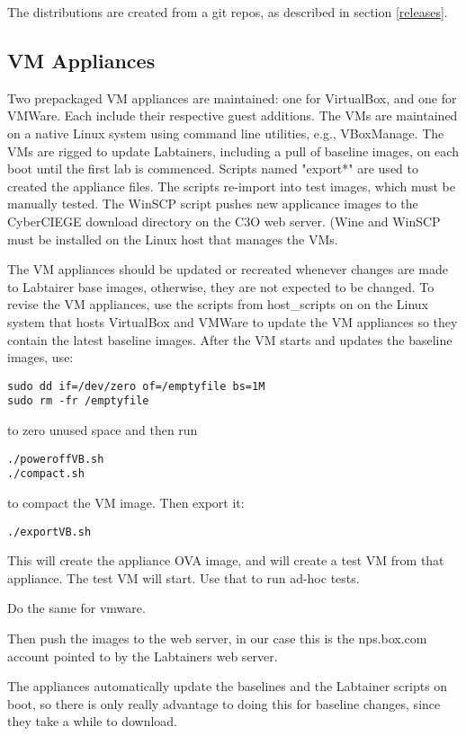 \documentclass[12pt]{article}
\begin{document}
The distributions are created from a git repos, as described in section \ref{releases}.

\subsection{VM Appliances}
Two prepackaged VM appliances are maintained: one for VirtualBox, and one for VMWare.  Each include
their respective guest additions.  The VMs are maintained on a native Linux system using command line
utilities, e.g., VBoxManage.  The VMs are rigged to update Labtainers, including a pull of
baseline images, on each boot until the first lab is commenced.  Scripts named "export*" are
used to created the appliance files.  The scripts re-import into test images, which must be
manually tested.  The WinSCP script pushes new applicance images to the CyberCIEGE download
directory on the C3O web server.  (Wine and WinSCP must be installed on the Linux host that
manages the VMs.

The VM appliances should be updated or recreated whenever changes are made to Labtairer base
images, otherwise, they are not expected to be changed.  To revise the VM appliances, use the scripts
from host\_scripts on 
on the Linux system that hosts VirtualBox and VMWare to update the VM appliances so they contain the latest baseline images.
After the VM starts and updates the baseline images, use:
\begin{verbatim}
sudo dd if=/dev/zero of=/emptyfile bs=1M
sudo rm -fr /emptyfile
\end{verbatim}
\noindent to zero unused space and then run
\begin{verbatim}
./poweroffVB.sh
./compact.sh
\end{verbatim}
\noindent to compact the VM image.  Then export it:
\begin{verbatim}
./exportVB.sh
\end{verbatim}
\noindent This will create the appliance OVA image, and will create a test
VM from that appliance.  The test VM will start.  Use that to run ad-hoc
tests.

Do the same for vmware.

Then push the images to the web server, in our case this is the nps.box.com account
pointed to by the Labtainers web server.

The appliances automatically update the baselines and the Labtainer scripts on boot, so there
is only really advantage to doing this for baseline changes, since they take a while to download.
\end{document}
